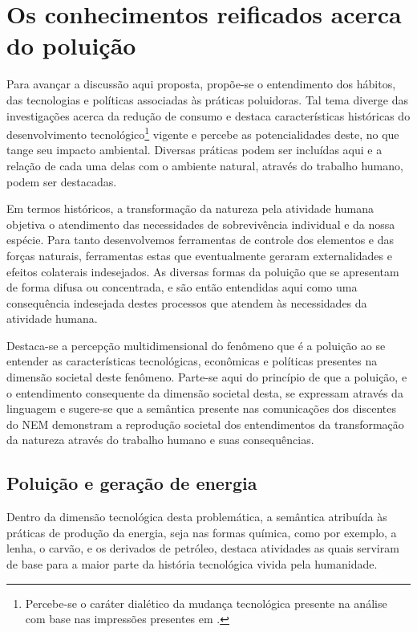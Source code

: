 \documentclass[
  12pt,       %
  openright,      %
  twoside,      %
  a4paper,      %
  english,      %
  french,       %
  spanish,      %
  brazil        %
  ]{abntex2}
\begin{document}
\section{Os conhecimentos reificados acerca do poluição}

Para avançar a discussão aqui proposta, propõe-se o entendimento dos hábitos, das tecnologias e políticas associadas às práticas poluidoras. Tal tema diverge das investigações acerca da redução de consumo e destaca características históricas do desenvolvimento tecnológico\footnote{Percebe-se o caráter dialético da mudança tecnológica presente na análise com base nas impressões presentes em .} vigente e percebe as potencialidades deste, no que tange seu impacto ambiental. Diversas práticas podem ser incluídas aqui e a relação de cada uma delas com o ambiente natural, através do trabalho humano, podem ser destacadas.

Em termos históricos, a transformação da natureza pela atividade humana objetiva o atendimento das necessidades de sobrevivência individual e da nossa espécie. Para tanto desenvolvemos ferramentas de controle dos elementos e das forças naturais, ferramentas estas que eventualmente geraram externalidades e efeitos colaterais indesejados. As diversas formas da poluição que se apresentam de forma difusa ou concentrada, e são então entendidas aqui como uma consequência indesejada destes processos que atendem às necessidades da atividade humana. 

Destaca-se a percepção multidimensional do fenômeno que é a poluição ao se entender as características tecnológicas, econômicas e políticas presentes na dimensão societal deste fenômeno. Parte-se aqui do princípio de que a poluição, e o entendimento consequente da dimensão societal desta, se expressam através da linguagem e sugere-se que a semântica presente nas comunicações dos discentes do NEM demonstram a reprodução societal dos entendimentos da transformação da natureza através do trabalho humano e suas consequências.


\subsection{Poluição e geração de energia}

Dentro da dimensão tecnológica desta problemática, a semântica atribuída às práticas de produção da energia, seja nas formas química, como por exemplo, a lenha, o carvão, e os derivados de petróleo, destaca atividades as quais serviram de base para a maior parte da história tecnológica vivida pela humanidade.
\end{document}
